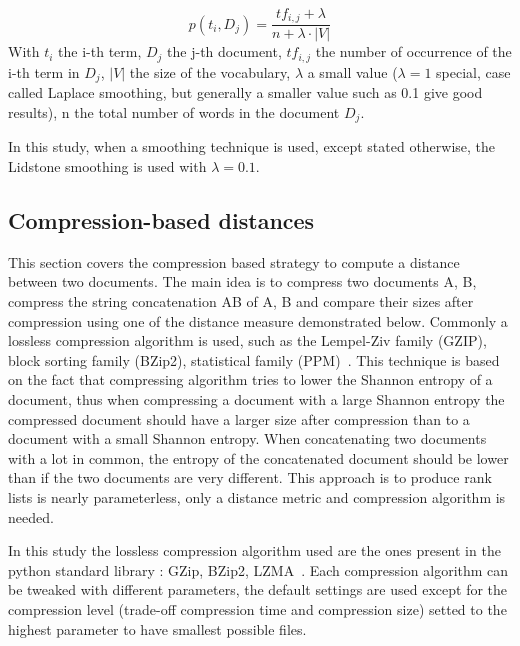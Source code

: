 \begin{definition}
  \label{def:lidstone_smoothing}
  \begin{equation}
    p(t_i, D_j) = \frac{tf_{i,j} + \lambda}{n + \lambda \cdot |V|}
  \end{equation}
  With $t_i$ the i-th term, $D_j$ the j-th document, $tf_{i,j}$ the number of occurrence of the i-th term in $D_j$, $|V|$ the size of the vocabulary, $\lambda$ a small value ($\lambda = 1$ special, case called Laplace smoothing, but generally a smaller value such as 0.1 give good results), n the total number of words in the document $D_j$.
\end{definition}

In this study, when a smoothing technique is used, except stated otherwise, the Lidstone smoothing is used with $\lambda = 0.1$.

\subsection{Compression-based distances \label{sec:compression_based_distances}}

This section covers the compression based strategy to compute a distance between two documents.
The main idea is to compress two documents A, B, compress the string concatenation AB of A, B and compare their sizes after compression using one of the distance measure demonstrated below.
Commonly a lossless compression algorithm is used, such as the Lempel-Ziv family (GZIP), block sorting family (BZip2), statistical family (PPM)~\cite{comparing_compression}.
This technique is based on the fact that compressing algorithm tries to lower the Shannon entropy of a document, thus when compressing a document with a large Shannon entropy the compressed document should have a larger size after compression than to a document with a small Shannon entropy.
When concatenating two documents with a lot in common, the entropy of the concatenated document should be lower than if the two documents are very different.
This approach is to produce rank lists is nearly parameterless, only a distance metric and compression algorithm is needed.

In this study the lossless compression algorithm used are the ones present in the python standard library : GZip, BZip2, LZMA~\cite{python_compression}.
Each compression algorithm can be tweaked with different parameters, the default settings are used except for the compression level (trade-off compression time and compression size) setted to the highest parameter to have smallest possible files.


